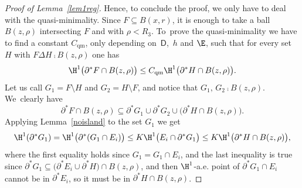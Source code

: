 \begin{proof}[Proof of Lemma~\ref{lem1reg}]
Hence, to conclude the proof, we only have to deal with the quasi-minimality. Since $F\subseteq B(x,r)$, it is enough to take a ball $B(z,\rho)$ intersecting $F$ and with $\rho<R_3$. To~prove the quasi-minimality we have to find a constant $C_\mathrm{qm}$, only depending on~$\mathsf{D}$,~$h$ and $\E$, such that for every set $H$ with $F\Delta H \comp B(z,\rho)$ one has
\begin{equation}\label{quasimin}
\H^1\big(\partial^* F \cap B(z,\rho)\big)\leq C_\mathrm{qm} \H^1\big(\partial^* H \cap B(z,\rho)\big).
\end{equation}
Let us call $G_1=F\setminus H$ and $G_2=H\setminus F$, and notice that $G_1,\,G_2 \comp B(z,\rho)$. We~clearly have
\begin{equation}\label{subdiv2}
\partial^* F \cap B(z,\rho) \subseteq \partial^* G_1 \cup \partial^* G_2\cup \big(\partial^* H\cap B(z,\rho)\big).
\end{equation}
Applying Lemma~\ref{noisland} to the set $G_1$ we get
\begin{equation}\label{estG1}
\H^1(\partial^* G_1) = \H^1\big(\partial ^*(G_1 \cap E_i)\big) \leq K \H^1\big(E_i \cap \partial^* G_1\big)\leq K \H^1\big(\partial^* H \cap B(z,\rho)\big),
\end{equation}
where the first equality holds since $G_1 = G_1\cap E_i$, and the last inequality is true since $\partial^* G_1 \subseteq \big(\partial^* E_i \cup \partial^* H \big)\cap B(z,\rho)$, and then $\H^1$-a.e. point of $\partial^* G_1\cap E_i$ cannot be in $\partial^* E_i$, so it must be in $\partial^* H\cap B(z,\rho)$.


\end{proof}
